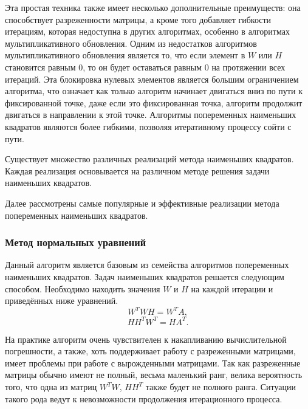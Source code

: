 Эта простая техника также имеет несколько дополнительные преимуществ:
она способствует разреженности матрицы, а кроме того добавляет гибкости итерациям,
которая недоступна в других алгоритмах, особенно в алгоритмах мультипликативного обновления.
Одним из недостатков алгоритмов мультипликативного обновления является то,
что если элемент в $W$ или $H$ становится равным $0$,
то он будет оставаться равным $0$ на протяжении всех итераций.
Эта блокировка нулевых элементов является большим ограничением алгоритма,
что означает как только алгоритм начинает двигаться вниз по пути к фиксированной точке,
даже если это  фиксированная точка, алгоритм продолжит двигаться в направлении к этой точке.
Алгоритмы попеременных наименьших квадратов являются более гибкими,
позволяя итеративному процессу сойти с  пути.




\newpage




Существует множество различных реализаций метода наименьших квадратов.
Каждая реализация основывается на различном методе решения задачи наименьших квадратов.

Далее рассмотрены самые популярные и эффективные реализации метода попеременных наименьших квадратов.

\subsubsection{Метод нормальных уравнений}

Данный алгоритм является базовым из семейства алгоритмов попеременных наименьших квадратов.
Задач наименьших квадратов решается следующим способом.
Необходимо находить значения $W$ и $H$ на каждой итерации и приведённых ниже уравнений.
\begin{equation}
  W^T W H = W^T A,
\end{equation}
\begin{equation}
  H H^T W^T = H A^T.
\end{equation}


На практике алгоритм очень чувствителен к накапливанию вычислительной погрешности,
а также, хоть поддерживает работу с разреженными матрицами, имеет проблемы при работе с вырожденными матрицами.
Так как разреженные матрицы обычно имеют не полный, весьма маленький ранг,
велика вероятность того, что одна из матриц $W^TW$, $HH^T$ также будет не полного ранга.
Ситуации такого рода ведут к невозможности продолжения итерационного процесса.

